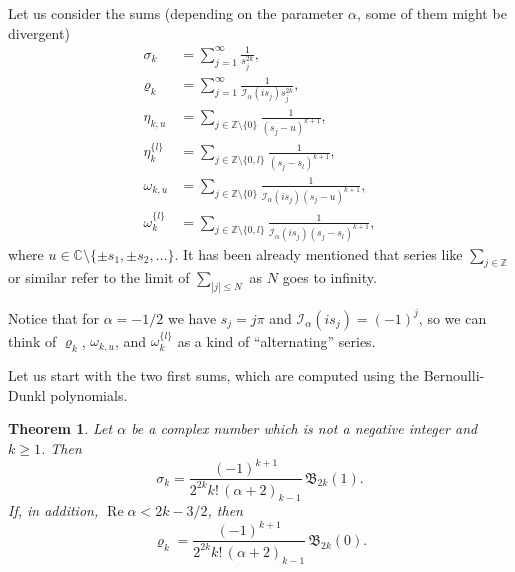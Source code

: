 \documentclass[10pt,a4paper]{article}
\theoremstyle{plain}
\newtheorem{theorem}{Theorem}[section]
\theoremstyle{definition}
\numberwithin{equation}{section} %
\newcommand{\I}{\mathcal{I}}
\newcommand{\B}{\mathfrak{B}}
\newcommand{\ZZ}{\mathbb{Z}}
\newcommand{\CC}{\mathbb{C}}
\newcommand{\ZZO}{\mathbb{Z} \setminus \{0\}}
\renewcommand{\Re}{\operatorname{Re}}
\begin{document}
Let us consider the sums (depending on the parameter $\alpha$, some of them might be divergent)
\begin{align}
\label{eq:sk}
  \sigma_k &= \sum_{j=1}^\infty \frac{1}{s_j^{2k}},\\
\label{eq:rk}
  \varrho_k &= \sum_{j=1}^\infty \frac{1}{\I_{\alpha}(is_j)s_j^{2k}},\\
\label{eq:mam}
  \eta_{k,u} &= \sum_{j\in \ZZO} \frac{1}{(s_j-u)^{k+1}},\\
\label{eq:cal}
  \eta_k^{\{l\}} &= \sum_{j\in \ZZ\setminus\{0,l\}} \frac{1}{(s_j-s_l)^{k+1}},\\
\label{eq:vku}
  \omega_{k,u} &= \sum_{j\in \ZZO}\frac{1}{\I_\alpha(is_j)(s_j-u)^{k+1}},\\
\label{eq:vk}
  \omega_k^{\{l\}} &= \sum_{j\in \ZZ\setminus\{0,l\}} \frac{1}{\I_\alpha(is_j)(s_j-s_l)^{k+1}},
\end{align}
where $u\in \CC\setminus\{\pm s_1,\pm s_2,\dots\}$.
It has been already mentioned that series like $\sum_{j\in \ZZ}$ or similar refer to the limit of $\sum_{|j|\leq N}$ as $N$ goes to infinity.

Notice that for $\alpha=-1/2$ we have $s_j=j\pi$ and $\I_{\alpha}(is_j)=(-1)^j$,
so we can think of $\varrho_k$, $\omega_{k,u}$, and $\omega_k^{\{l\}}$ as a kind of ``alternating'' series.

Let us start with the two first sums, which are computed using the Bernoulli-Dunkl polynomials.

\begin{theorem}
\label{thm:sumassr}
Let $\alpha$ be a complex number which is not a negative integer and $k \ge 1$. Then
\begin{equation}
\label{eq:alpm1}
  \sigma_{k} = \frac{(-1)^{k+1}}{2^{2k}k!\,(\alpha+2)_{k-1}} \,\B_{2k}(1).
\end{equation}
If, in addition, $\Re \alpha < 2k -3/2$, then
\begin{equation}
\label{eq:alpm2}
  \varrho_{k} = \frac{(-1)^{k+1}}{2^{2k}k!\,(\alpha+2)_{k-1}} \,\B_{2k}(0).
\end{equation}
\end{theorem}
\end{document}
